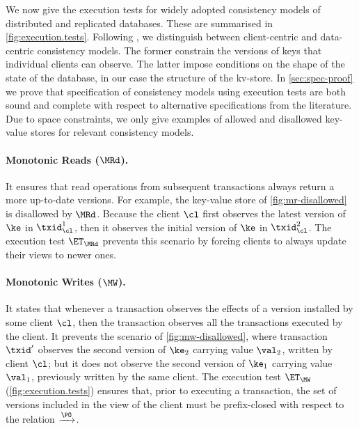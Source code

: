 

We now give the execution tests for widely adopted consistency models of distributed and replicated databases. 
These are summarised in \cref{fig:execution.tests}.
Following \cite{distrprinciples}, we distinguish between client-centric and data-centric consistency models. 
The former constrain the versions of keys that individual clients can observe. 
The latter impose conditions on the shape of the state of the database, in our case the structure of the kv-store.
In \cref{sec:spec-proof} we prove that specification of consistency models using execution tests
are both sound and complete with respect to alternative specifications from the literature.
Due to space constraints, we only give examples of allowed and disallowed key-value stores for relevant consistency models. 

\paragraph{Monotonic Reads ($\MRd$).}
It ensures that read operations from subsequent transactions always return a more up-to-date versions.
For example, the key-value store of \cref{fig:mr-disallowed} is disallowed by $\MRd$.
Because the client $\cl$ first observes the latest version of $\ke$ in $\txid_{\cl}^{1}$,
then it observes the initial version of $\ke$ in $\txid_{\cl}^{2}$.
The execution test $\ET_{\MRd}$ prevents this scenario by forcing clients to always update their views to newer ones. 

\paragraph{Monotonic Writes ($\MW$).}
It states that whenever a transaction observes the effects of a version installed by some client $\cl$,
then the transaction observes all the transactions executed by the client. 
It prevents the scenario of \cref{fig:mw-disallowed}, 
where transaction $\txid'$ observes the second version of $\ke_2$ carrying value $\val_2$, written by client $\cl$;
but it does not observe the second version of $\ke_1$ carrying value $\val_1$, previously written by the same client.
The execution test $\ET_{\MW}$ (\cref{fig:execution.tests}) ensures that, prior to executing a transaction,
the set of versions included in the view of the client must be prefix-closed with respect to the relation $\xrightarrow{\PO}$.

